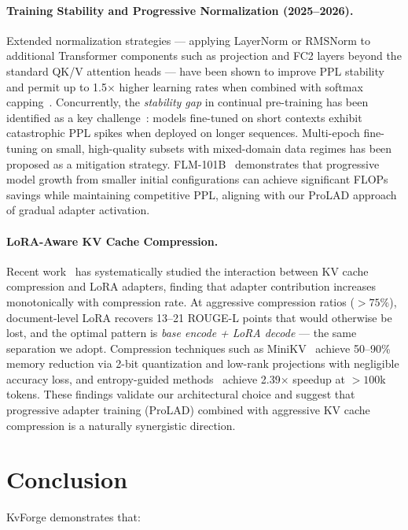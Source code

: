 \documentclass[11pt]{article}
\begin{document}
\paragraph{Training Stability and Progressive Normalization (2025--2026).}
Extended normalization strategies --- applying LayerNorm or RMSNorm to additional Transformer components such as projection and FC2 layers beyond the standard QK/V attention heads --- have been shown to improve PPL stability and permit up to 1.5$\times$ higher learning rates when combined with softmax capping~\cite{extended_norm}. Concurrently, the \emph{stability gap} in continual pre-training has been identified as a key challenge~\cite{stability_gap}: models fine-tuned on short contexts exhibit catastrophic PPL spikes when deployed on longer sequences. Multi-epoch fine-tuning on small, high-quality subsets with mixed-domain data regimes has been proposed as a mitigation strategy. FLM-101B~\cite{flm101b} demonstrates that progressive model growth from smaller initial configurations can achieve significant FLOPs savings while maintaining competitive PPL, aligning with our ProLAD approach of gradual adapter activation.

\paragraph{LoRA-Aware KV Cache Compression.}
Recent work~\cite{rethinking_lora} has systematically studied the interaction between KV cache compression and LoRA adapters, finding that adapter contribution increases monotonically with compression rate. At aggressive compression ratios ($>75\%$), document-level LoRA recovers 13--21 ROUGE-L points that would otherwise be lost, and the optimal pattern is \emph{base encode + LoRA decode} --- the same separation we adopt. Compression techniques such as MiniKV~\cite{minikv} achieve 50--90\% memory reduction via 2-bit quantization and low-rank projections with negligible accuracy loss, and entropy-guided methods~\cite{entropyinfer} achieve 2.39$\times$ speedup at $>100$k tokens. These findings validate our architectural choice and suggest that progressive adapter training (ProLAD) combined with aggressive KV cache compression is a naturally synergistic direction.
\section{Conclusion}
\label{sec:conclusion}

KvForge demonstrates that:
\end{document}
